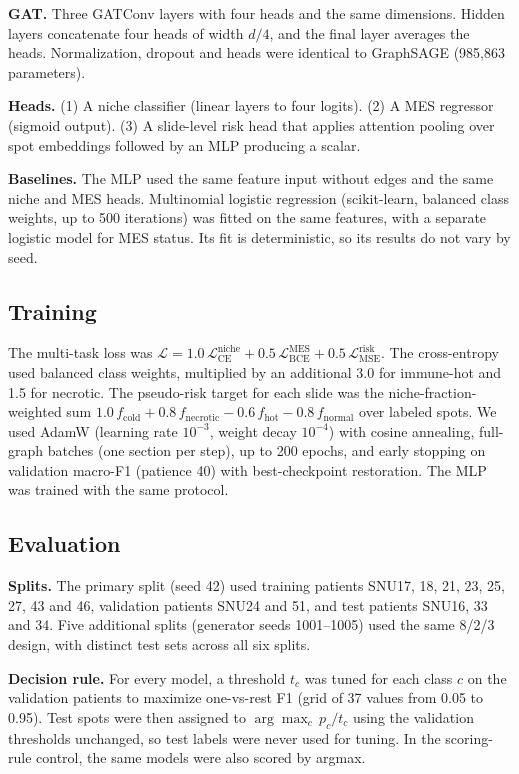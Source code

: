 \documentclass[11pt,letterpaper]{article}
\begin{document}
\textbf{GAT.} Three GATConv layers \cite{velickovic2018} with four heads and the same dimensions. Hidden layers concatenate four heads of width $d/4$, and the final layer averages the heads. Normalization, dropout and heads were identical to GraphSAGE (985{,}863 parameters).

\textbf{Heads.} (1) A niche classifier (linear layers to four logits). (2) A MES regressor (sigmoid output). (3) A slide-level risk head that applies attention pooling over spot embeddings followed by an MLP producing a scalar.

\textbf{Baselines.} The MLP used the same feature input without edges and the same niche and MES heads. Multinomial logistic regression (scikit-learn, balanced class weights, up to 500 iterations) was fitted on the same features, with a separate logistic model for MES status. Its fit is deterministic, so its results do not vary by seed.

\subsection{Training}

The multi-task loss was $\mathcal{L} = 1.0\,\mathcal{L}_\mathrm{CE}^\mathrm{niche} + 0.5\,\mathcal{L}_\mathrm{BCE}^\mathrm{MES} + 0.5\,\mathcal{L}_\mathrm{MSE}^\mathrm{risk}$. The cross-entropy used balanced class weights, multiplied by an additional 3.0 for immune-hot and 1.5 for necrotic. The pseudo-risk target for each slide was the niche-fraction-weighted sum $1.0\,f_\mathrm{cold} + 0.8\,f_\mathrm{necrotic} - 0.6\,f_\mathrm{hot} - 0.8\,f_\mathrm{normal}$ over labeled spots. We used AdamW (learning rate $10^{-3}$, weight decay $10^{-4}$) with cosine annealing, full-graph batches (one section per step), up to 200 epochs, and early stopping on validation macro-F1 (patience 40) with best-checkpoint restoration. The MLP was trained with the same protocol.

\subsection{Evaluation}

\textbf{Splits.} The primary split (seed 42) used training patients SNU17, 18, 21, 23, 25, 27, 43 and 46, validation patients SNU24 and 51, and test patients SNU16, 33 and 34. Five additional splits (generator seeds 1001--1005) used the same 8/2/3 design, with distinct test sets across all six splits.

\textbf{Decision rule.} For every model, a threshold $t_c$ was tuned for each class $c$ on the validation patients to maximize one-vs-rest F1 (grid of 37 values from 0.05 to 0.95). Test spots were then assigned to $\arg\max_c\, p_c / t_c$ using the validation thresholds unchanged, so test labels were never used for tuning. In the scoring-rule control, the same models were also scored by argmax.
\end{document}
